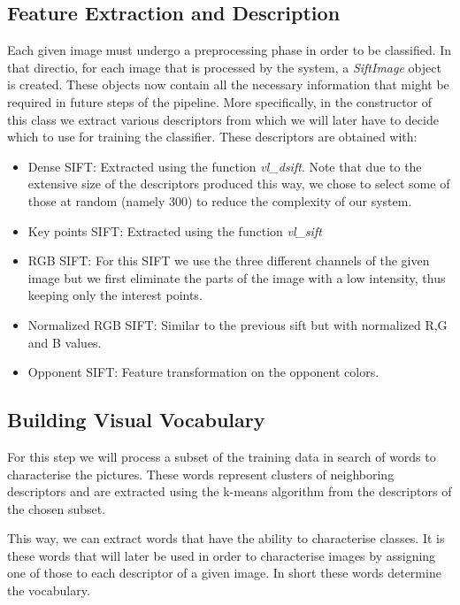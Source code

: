 \documentclass[11pt]{article}
\begin{document}
\subsection{Feature Extraction and Description}
\label{featureExtraction}
Each given image must undergo a preprocessing phase in order to be classified. In that directio, for each image that is processed by the system, a \emph{SiftImage} object is created. These objects now contain all the necessary information that might be required in future steps of the pipeline. More specifically, in the constructor of this class we extract various descriptors from which we will later have to decide which to use for training the classifier. These descriptors are obtained with:
\begin{itemize}
\item Dense SIFT: Extracted using the function \emph{vl\_dsift}\cite{vedaldi08vlfeat}. Note that due to the extensive size of the descriptors produced this way, we chose to select some of those at random (namely 300) to reduce the complexity of our system.
\item Key points SIFT: Extracted using the function \emph{vl\_sift}\cite{vedaldi08vlfeat}
\item RGB SIFT: For this SIFT we use the three different channels of the given image but we first eliminate the parts of the image with a low intensity, thus keeping only the interest points.
\item Normalized RGB SIFT: Similar to the previous sift but with normalized R,G and B values.
\item Opponent SIFT: Feature transformation on the opponent colors.
\end{itemize}

\subsection{Building Visual Vocabulary}
For this step we will process a subset of the training data in search of words to characterise the pictures. These words represent clusters of neighboring descriptors and are extracted using the k-means algorithm \cite{vedaldi08vlfeat} from the descriptors of the chosen subset.

This way, we can extract words that have the ability to characterise classes. It is these words that will later be used in order to characterise images by assigning one of those to each descriptor of a given image. In short these words determine the vocabulary.
\end{document}
